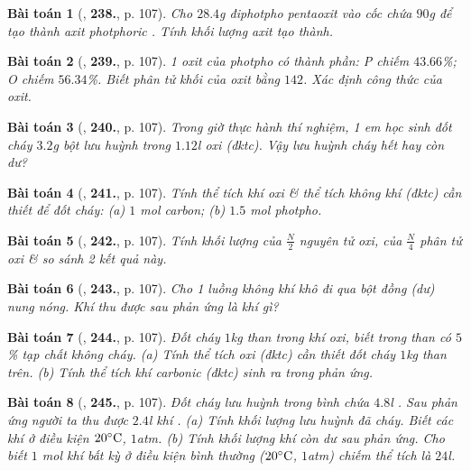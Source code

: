 \documentclass{article}
\numberwithin{equation}{section}
\newtheorem{baitoan}{Bài toán}
\begin{document}
\begin{baitoan}[\cite{An_400_BT_Hoa_Hoc_8_2020}, \textbf{238.}, p. 107]
	Cho $28.4$\emph{g} điphotpho pentaoxit \emph{} vào cốc chứa $90$\emph{g} \emph{} để tạo thành axit photphoric \emph{}. Tính khối lượng axit \emph{} tạo thành.
\end{baitoan}

\begin{baitoan}[\cite{An_400_BT_Hoa_Hoc_8_2020}, \textbf{239.}, p. 107]
	1 oxit của photpho có thành phần: \emph{P} chiếm $43.66$\%; \emph{O} chiếm $56.34$\%. Biết phân tử khối của oxit bằng $142$. Xác định công thức của oxit.
\end{baitoan}

\begin{baitoan}[\cite{An_400_BT_Hoa_Hoc_8_2020}, \textbf{240.}, p. 107]
	Trong giờ thực hành thí nghiệm, 1 em học sinh đốt cháy $3.2$\emph{g} bột lưu huỳnh trong $1.12$\emph{l} oxi (đktc). Vậy lưu huỳnh cháy hết hay còn dư?
\end{baitoan}

\begin{baitoan}[\cite{An_400_BT_Hoa_Hoc_8_2020}, \textbf{241.}, p. 107]
	Tính thể tích khí oxi \& thể tích không khí (đktc) cần thiết để đốt cháy: (a) $1$ \emph{mol} carbon; (b) $1.5$ \emph{mol} photpho.
\end{baitoan}

\begin{baitoan}[\cite{An_400_BT_Hoa_Hoc_8_2020}, \textbf{242.}, p. 107]
	Tính khối lượng của $\frac{N}{2}$ nguyên tử oxi, của $\frac{N}{4}$ phân tử oxi \& so sánh 2 kết quả này.
\end{baitoan}

\begin{baitoan}[\cite{An_400_BT_Hoa_Hoc_8_2020}, \textbf{243.}, p. 107]
	Cho 1 luồng không khí khô đi qua bột đồng (dư) nung nóng. Khí thu được sau phản ứng là khí gì?
\end{baitoan}

\begin{baitoan}[\cite{An_400_BT_Hoa_Hoc_8_2020}, \textbf{244.}, p. 107]
	Đốt cháy $1$\emph{kg} than trong khí oxi, biết trong than có $5$\% tạp chất không cháy. (a) Tính thể tích oxi (đktc) cần thiết đốt cháy $1$\emph{kg} than trên. (b) Tính thể tích khí carbonic (đktc) sinh ra trong phản ứng.
\end{baitoan}

\begin{baitoan}[\cite{An_400_BT_Hoa_Hoc_8_2020}, \textbf{245.}, p. 107]
	Đốt cháy lưu huỳnh trong bình chứa $4.8$\emph{l }. Sau phản ứng người ta thu được $2.4$\emph{l} khí \emph{}. (a) Tính khối lượng lưu huỳnh đã cháy. Biết các khí ở điều kiện $20^\circ{\rm C}$, $1$\emph{atm}. (b) Tính khối lượng khí \emph{} còn dư sau phản ứng. Cho biết $1$ \emph{mol} khí bất kỳ ở điều kiện bình thường ($20^\circ{\rm C}$, $1$\emph{atm}) chiếm thể tích là $24$\emph{l}.
\end{baitoan}
\end{document}
